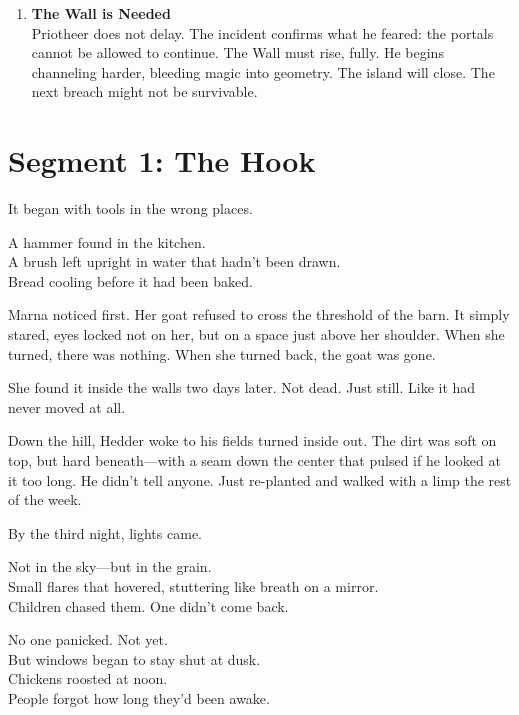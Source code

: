 \documentclass[9pt]{article}
\begin{document}
\begin{enumerate}
    \vspace{1em}
    \item \textbf{The Wall is Needed} \\
    Priotheer does not delay. The incident confirms what he feared: the portals cannot be allowed to continue. The Wall must rise, fully. He begins channeling harder, bleeding magic into geometry. The island will close. The next breach might not be survivable.

\end{enumerate}


\newpage

\section*{Segment 1: The Hook}

It began with tools in the wrong places.

\vspace{0.5em}
A hammer found in the kitchen.\\
A brush left upright in water that hadn’t been drawn.\\
Bread cooling before it had been baked.

\vspace{0.5em}
Marna noticed first. Her goat refused to cross the threshold of the barn. It simply stared, eyes locked not on her, but on a space just above her shoulder. When she turned, there was nothing. When she turned back, the goat was gone.

\vspace{0.5em}
She found it inside the walls two days later. Not dead. Just still. Like it had never moved at all.

\vspace{0.5em}
Down the hill, Hedder woke to his fields turned inside out. The dirt was soft on top, but hard beneath---with a seam down the center that pulsed if he looked at it too long. He didn’t tell anyone. Just re-planted and walked with a limp the rest of the week.

\vspace{0.5em}
By the third night, lights came.

\vspace{0.5em}
Not in the sky---but in the grain.\\
Small flares that hovered, stuttering like breath on a mirror.\\
Children chased them. One didn’t come back.

\vspace{0.5em}
No one panicked. Not yet.\\
But windows began to stay shut at dusk.\\
Chickens roosted at noon.\\
People forgot how long they’d been awake.
\end{document}
